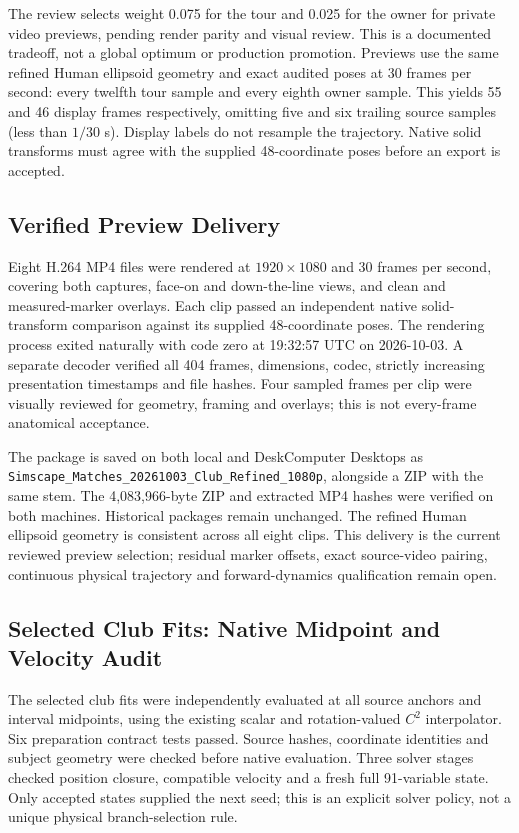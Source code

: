 \documentclass[11pt,a4paper]{article}
\begin{document}
The review selects weight 0.075 for the tour and 0.025 for the owner for
private video previews, pending render parity and visual review. This is
a documented tradeoff, not a global optimum or production promotion.
Previews use the same refined Human ellipsoid geometry and exact audited
poses at 30 frames per second: every twelfth tour sample and every eighth
owner sample. This yields 55 and 46 display frames respectively, omitting
five and six trailing source samples (less than $1/30$ s). Display labels
do not resample the trajectory. Native solid transforms must agree with
the supplied 48-coordinate poses before an export is accepted.

\subsection{Verified Preview Delivery}
Eight H.264 MP4 files were rendered at $1920\times1080$ and 30 frames
per second, covering both captures, face-on and down-the-line views,
and clean and measured-marker overlays. Each clip passed an independent
native solid-transform comparison against its supplied 48-coordinate
poses. The rendering process exited naturally with code zero at
19:32:57 UTC on 2026-10-03. A separate decoder verified all 404 frames,
dimensions, codec, strictly increasing presentation timestamps and file
hashes. Four sampled frames per clip were visually reviewed for geometry,
framing and overlays; this is not every-frame anatomical acceptance.

The package is saved on both local and DeskComputer Desktops as
\texttt{Simscape\_Matches\_20261003\_Club\_Refined\_1080p}, alongside
a ZIP with the same stem. The 4,083,966-byte ZIP and extracted MP4 hashes
were verified on both machines. Historical packages remain unchanged.
The refined Human ellipsoid geometry is consistent across all eight
clips. This delivery is the current reviewed preview selection; residual
marker offsets, exact source-video pairing, continuous physical trajectory
and forward-dynamics qualification remain open.

\subsection{Selected Club Fits: Native Midpoint and Velocity Audit}
The selected club fits were independently evaluated at all source anchors
and interval midpoints, using the existing scalar and rotation-valued
$C^2$ interpolator. Six preparation contract tests passed. Source hashes,
coordinate identities and subject geometry were checked before native
evaluation. Three solver stages checked position closure, compatible
velocity and a fresh full 91-variable state. Only accepted states supplied
the next seed; this is an explicit solver policy, not a unique physical
branch-selection rule.
\end{document}
